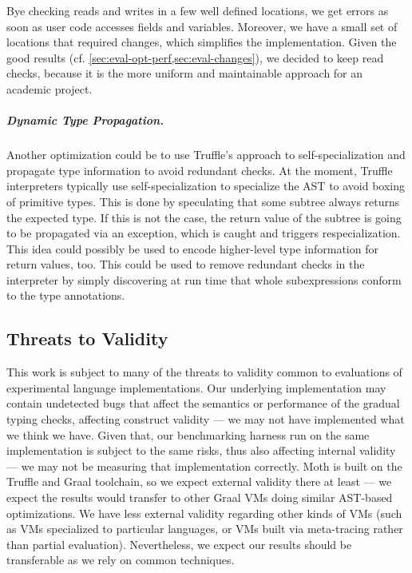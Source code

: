 Bye checking reads and writes in a few well defined locations,
we get errors as soon as user code accesses fields and variables.
Moreover, we have a small set of locations that required changes,
which simplifies the implementation.
Given the good
results (cf. \cref{sec:eval-opt-perf,sec:eval-changes}), we decided to keep read checks, because it is the more uniform and maintainable
approach for an academic project.


\subparagraph{Dynamic Type Propagation.}
Another optimization could be to use Truffle's approach to 
self-specialization\citep{Wurthinger:2012:SelfOptAST}
and propagate type information to avoid redundant checks.
At the moment, Truffle interpreters typically use self-specialization to 
specialize the AST to avoid boxing of primitive types.
This is done by speculating that some subtree always returns the expected type.
If this is not the case, the return value of the subtree is going to be
propagated via an exception, which is caught and triggers respecialization.
This idea could possibly be used to encode higher-level type information for
return values, too.
This could be used to remove redundant checks in the interpreter
by simply discovering at run time that whole subexpressions conform to the
type annotations.

\subsection{Threats to Validity}


This work is subject to many of the threats to validity common to
evaluations of experimental language implementations.  Our underlying
implementation may contain undetected bugs that affect the semantics
or performance of the gradual typing checks, affecting construct
validity --- we may not have implemented what we think we have. Given
that, our benchmarking harness run on the same implementation is
subject to the same risks, thus also affecting internal validity ---
we may not be measuring that implementation correctly.  Moth is built
on the Truffle and Graal toolchain, so we expect external validity
there at least --- we expect the results would transfer to other Graal
VMs doing similar AST-based optimizations.  We have less external
validity regarding other kinds of VMs (such as VMs specialized to 
particular languages, or VMs built via meta-tracing rather than partial evaluation). 
Nevertheless, we expect our results should be transferable
as we rely on common techniques.

